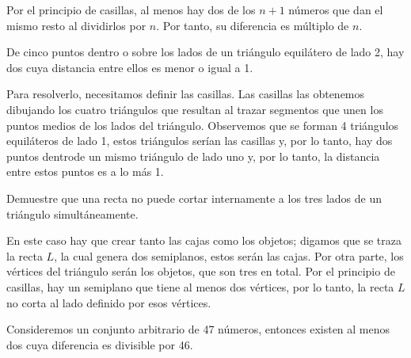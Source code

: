 \documentclass[12pt]{article}
\begin{document}
\begin{solucion}
    Por el principio de casillas, al menos hay dos de los $n+1$ números que dan el mismo resto al dividirlos por $n$.  Por tanto, su diferencia es múltiplo de $n$.
\end{solucion}

\begin{ejemplo}
    De cinco puntos dentro o sobre los lados de un triángulo equilátero de lado 2, hay dos cuya distancia entre ellos es menor o igual a 1.
\end{ejemplo}

\begin{solucion}
    Para resolverlo, necesitamos definir las casillas.  Las casillas las obtenemos dibujando los cuatro triángulos que resultan al trazar segmentos que unen los puntos medios de los lados del triángulo. Observemos que se forman 4 triángulos equiláteros de lado 1, estos triángulos serían las casillas y, por lo tanto, hay dos puntos dentrode un mismo triángulo de lado uno y, por lo tanto, la distancia entre estos puntos es a lo más 1.
\end{solucion}

\begin{ejemplo}
    Demuestre que una recta no puede cortar internamente a los tres lados de un triángulo simultáneamente.
\end{ejemplo}

\begin{solucion}
    En este caso hay que crear tanto las cajas como los objetos; digamos que se traza la recta $L$, la cual genera dos semiplanos, estos serán las cajas. Por otra parte, los vértices del triángulo serán los objetos, que son tres en total.  Por el principio de casillas, hay un semiplano que tiene al menos dos vértices, por lo tanto, la recta $L$ no corta al lado definido por esos vértices.
\end{solucion}

\begin{ejemplo}
    Consideremos un conjunto arbitrario de 47 números, entonces existen al menos dos cuya diferencia es divisible por 46.
\end{ejemplo}
\end{document}

